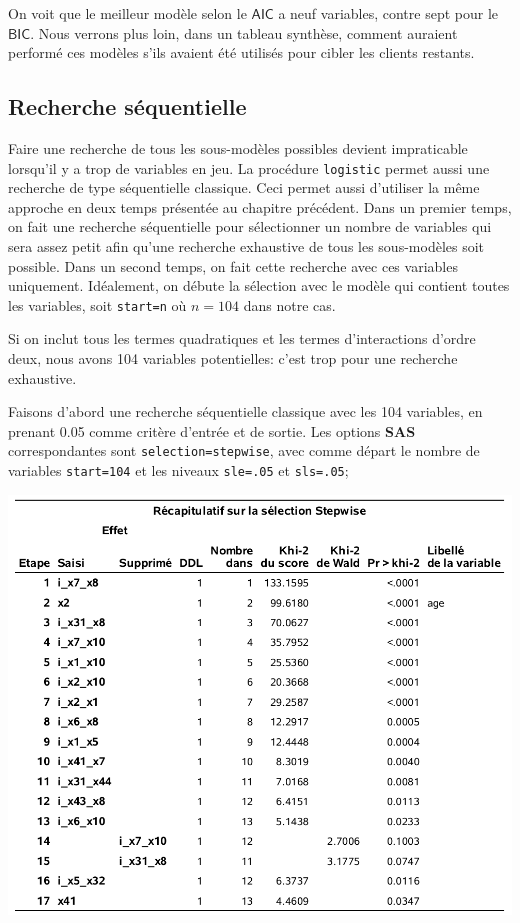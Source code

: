 \documentclass[
  11pt,
  letterpaper,
]{book}
\theoremstyle{definition}
\theoremstyle{definition}
\theoremstyle{definition}
\theoremstyle{remark}
\begin{document}
On voit que le meilleur modèle selon le \(\mathsf{AIC}\) a neuf variables, contre sept pour le \(\mathsf{BIC}\). Nous verrons plus loin, dans un tableau synthèse, comment auraient performé ces modèles s'ils avaient été utilisés pour cibler les clients restants.

\hypertarget{recherche-suxe9quentielle}{%
\subsection{Recherche séquentielle}\label{recherche-suxe9quentielle}}

Faire une recherche de tous les sous-modèles possibles devient impraticable lorsqu'il y a trop de variables en jeu. La procédure \texttt{logistic} permet aussi une recherche de type séquentielle classique. Ceci permet aussi d'utiliser la même approche en deux temps présentée au chapitre précédent. Dans un premier temps, on fait une recherche séquentielle pour sélectionner un nombre de variables qui sera assez petit afin qu'une recherche exhaustive de tous les sous-modèles soit possible. Dans un second temps, on fait cette recherche avec ces variables uniquement. Idéalement, on débute la sélection avec le modèle qui contient toutes les variables, soit \texttt{start=n} où \(n=104\) dans notre cas.

Si on inclut tous les termes quadratiques et les termes d'interactions d'ordre deux, nous avons 104 variables potentielles: c'est trop pour une recherche exhaustive.

Faisons d'abord une recherche séquentielle classique avec les 104 variables, en prenant 0.05 comme critère d'entrée et de sortie. Les options \textbf{SAS} correspondantes sont
\texttt{selection=stepwise}, avec comme départ le nombre de variables \texttt{start=104} et les niveaux \texttt{sle=.05} et \texttt{sls=.05};

\begin{center}\includegraphics[width=0.8\linewidth]{figures/03-logistic-e22} \end{center}
\end{document}
